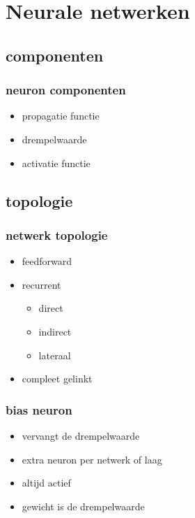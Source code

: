 \documentclass{beamer}
\begin{document}
\section{Neurale netwerken}
\subsection{componenten}
\begin{frame}
  \frametitle{neuron componenten}
  \begin{itemize}
    \item<+-> propagatie functie
    \item<+-> drempelwaarde
    \item<+-> activatie functie
  \end{itemize}
\end{frame}
\subsection{topologie}
\begin{frame}
  \frametitle{netwerk topologie}
  \begin{itemize}
    \item<+-> feedforward
    \item<+-> recurrent
      \begin{itemize}
        \item direct
        \item indirect
        \item lateraal
      \end{itemize}
    \item<+-> compleet gelinkt
  \end{itemize}
\end{frame}
\begin{frame}
  \frametitle{bias neuron}
  \begin{itemize}
    \item<+-> vervangt de drempelwaarde
    \item<+-> extra neuron per netwerk of laag
    \item<+-> altijd actief
    \item<+-> gewicht is de drempelwaarde
  \end{itemize}
\end{frame}
\end{document}
